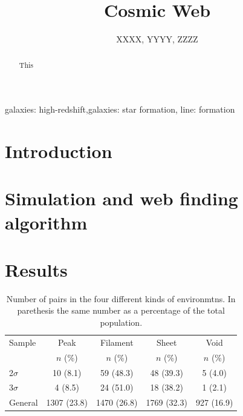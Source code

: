 \documentclass{emulateapj}
\begin{document}
\title{Cosmic Web} 
\author{
  XXXX,
  YYYY,
  ZZZZ
}

\begin{abstract}
This
\end{abstract}

\begin{keywords}
{galaxies: high-redshift,galaxies: star formation, line: formation}
\end{keywords}


\section{Introduction}
\label{sec:intro}

\section{Simulation and web finding algorithm}
\label{sec:Simulation}

\section{Results}
\label{sec:results}

\citep{Hillier98}


\begin{table}
\begin{center}
\begin{tabular}{lcccc}\hline\hline
Sample & Peak & Filament & Sheet & Void\\
       & $n$ (\%) & $n$ (\%) & $n$ (\%) & $n$ (\%) \\\hline
2$\sigma$ & 10 (8.1) & 59 (48.3) & 48 (39.3) & 5 (4.0)\\  
3$\sigma$ & 4 (8.5) & 24 (51.0) &  18 (38.2) & 1 (2.1)\\
General & 1307 (23.8) & 1470 (26.8) & 1769 (32.3) & 927 (16.9)\\\hline
\end{tabular}
\caption{
Number of pairs in the four different kinds of environmtns. In
parethesis the same number as a percentage of the
total population. }
\label{table:models}
\end{center}
\end{table}
\end{document}
